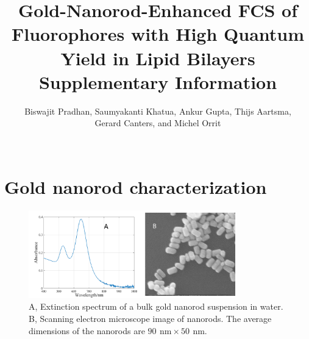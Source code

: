 \documentclass[11pt,a4paper,onecolumn]{article}
\newcommand{\nm}{\ensuremath{\,\textrm{nm}}}
\begin{document}
\author{
Biswajit Pradhan, Saumyakanti Khatua, Ankur Gupta,
Thijs Aartsma,\\ Gerard Canters, and Michel Orrit\\\\
}
\date{\vspace{1ex}} %

\title{\textbf{Gold-Nanorod-Enhanced FCS of Fluorophores with High Quantum Yield in Lipid Bilayers}\\ \vspace{3ex} Supplementary Information \vspace{3ex}}

\maketitle
\tableofcontents
\pagebreak

\section{Gold nanorod characterization}
\begin{figure}[ht]
  \centering
  \includegraphics[width=0.8\textwidth]{AuNR_uv-vis_SEM.png}
  \makeatletter
  \renewcommand{\fnum@figure}{\figurename~S\thefigure}
  \makeatother
  \caption{A, Extinction spectrum of a bulk gold nanorod suspension in water. B, Scanning electron microscope image 
  of nanorods. The average dimensions of the nanorods are $90~\nm\times50~\nm$.}
  \label{SIfig: AuNR_uv-vis}
\end{figure}
\end{document}
